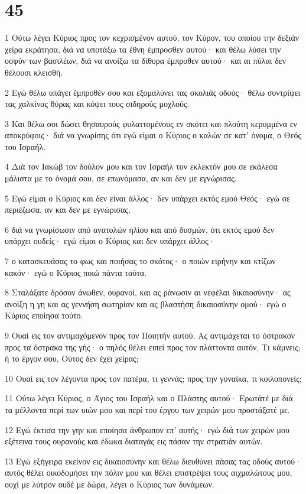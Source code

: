 \chapter{45}

\par 1 Ούτω λέγει Κύριος προς τον κεχρισμένον αυτού, τον Κύρον, του οποίου την δεξιάν χείρα εκράτησα, διά να υποτάξω τα έθνη έμπροσθεν αυτού· και θέλω λύσει την οσφύν των βασιλέων, διά να ανοίξω τα δίθυρα έμπροθεν αυτού· και αι πύλαι δεν θέλουσι κλεισθή.
\par 2 Εγώ θέλω υπάγει έμπροθέν σου και εξομαλύνει τας σκολιάς οδούς· θέλω συντρίψει τας χαλκίνας θύρας και κόψει τους σιδηρούς μοχλούς.
\par 3 Και θέλω σοι δώσει θησαυρούς φυλαττομένους εν σκότει και πλούτη κερυμμένα εν αποκρύφοις· διά να γνωρίσης ότι εγώ είμαι ο Κύριος ο καλών σε κατ' όνομα, ο Θεός του Ισραήλ.
\par 4 Διά τον Ιακώβ τον δούλον μου και τον Ισραήλ τον εκλεκτόν μου σε εκάλεσα μάλιστα με το όνομά σου, σε επωνόμασα, αν και δεν με εγνώρισας.
\par 5 Εγώ είμαι ο Κύριος και δεν είναι άλλος· δεν υπάρχει εκτός εμού Θεός· εγώ σε περιέζωσα, αν και δεν με εγνώρισας,
\par 6 διά να γνωρίσωσιν από ανατολών ηλίου και από δυσμών, ότι εκτός εμού δεν υπάρχει ουδείς· εγώ είμαι ο Κύριος και δεν υπάρχει άλλος·
\par 7 ο κατασκευάσας το φως και ποιήσας το σκότος· ο ποιών ειρήνην και κτίζων κακόν· εγώ ο Κύριος ποιώ πάντα ταύτα.
\par 8 Σταλάξατε δρόσον άνωθεν, ουρανοί, και ας ράνωσιν αι νεφέλαι δικαιοσύνην· ας ανοίξη η γη και ας γεννήση σωτηρίαν και ας βλαστήση δικαιοσύνην ομού· εγώ ο Κύριος εποίησα τούτο.
\par 9 Ουαί εις τον αντιμαχόμενον προς τον Ποιητήν αυτού. Ας αντιμάχεται το όστρακον προς τα όστρακα της γής· ο πηλός θέλει ειπεί προς τον πλάττοντα αυτόν, Τι κάμνεις; ή το έργον σου, Ούτος δεν έχει χείρας;
\par 10 Ουαί εις τον λέγοντα προς τον πατέρα, τι γεννάς; προς την γυναίκα, τι κοιλοπονείς;
\par 11 Ούτω λέγει Κύριος, ο Άγιος του Ισραήλ και ο Πλάστης αυτού· Ερωτάτέ με διά τα μέλλοντα περί των υιών μου και περί του έργου των χειρών μου προστάξατέ με.
\par 12 Εγώ έκτισα την γην και εποίησα άνθρωπον επ' αυτής· εγώ διά των χειρών μου εξέτεινα τους ουρανούς και έδωκα διαταγάς εις πάσαν την στρατιάν αυτών.
\par 13 Εγώ εξήγειρα εκείνον εις δικαιοσύνην και θέλω διευθύνει πάσας τας οδούς αυτού· αυτός θέλει οικοδομήσει την πόλιν μου και θέλει επιστρέψει τους αιχμαλώτους μου, ουχί με λύτρον ουδέ με δώρα, λέγει ο Κύριος των δυνάμεων.
